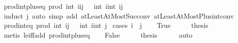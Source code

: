 \begin{isabellebody}
\isanewline
{}\isamarkupfalse%
\ prod{\isacharunderscore}{\kern0pt}int{\isacharunderscore}{\kern0pt}plus{\isacharunderscore}{\kern0pt}eq{\isacharcolon}{\kern0pt}\ {\isachardoublequoteopen}prod\ int\ {\isacharbraceleft}{\kern0pt}i{\isachardot}{\kern0pt}{\isachardot}{\kern0pt}i{\isacharplus}{\kern0pt}j{\isacharbraceright}{\kern0pt}\ {\isacharequal}{\kern0pt}\ \ {\isasymProd}{\isacharbraceleft}{\kern0pt}int\ i{\isachardot}{\kern0pt}{\isachardot}{\kern0pt}int\ {\isacharparenleft}{\kern0pt}i{\isacharplus}{\kern0pt}j{\isacharparenright}{\kern0pt}{\isacharbraceright}{\kern0pt}{\isachardoublequoteclose}\isanewline
%
\isadelimproof
\ \ %
\endisadelimproof
%
\isatagproof
{}\isamarkupfalse%
\ {\isacharparenleft}{\kern0pt}induct\ j{\isacharparenright}{\kern0pt}\ {\isacharparenleft}{\kern0pt}auto\ simp\ add{\isacharcolon}{\kern0pt}\ atLeastAtMostSuc{\isacharunderscore}{\kern0pt}conv\ atLeastAtMostPlus{}{\isacharunderscore}{\kern0pt}int{\isacharunderscore}{\kern0pt}conv{\isacharparenright}{\kern0pt}%
\endisatagproof
{\isafoldproof}%
%
\isadelimproof
\isanewline
%
\endisadelimproof
\isanewline
{}\isamarkupfalse%
\ prod{\isacharunderscore}{\kern0pt}int{\isacharunderscore}{\kern0pt}eq{\isacharcolon}{\kern0pt}\ {\isachardoublequoteopen}prod\ int\ {\isacharbraceleft}{\kern0pt}i{\isachardot}{\kern0pt}{\isachardot}{\kern0pt}j{\isacharbraceright}{\kern0pt}\ {\isacharequal}{\kern0pt}\ \ {\isasymProd}{\isacharbraceleft}{\kern0pt}int\ i{\isachardot}{\kern0pt}{\isachardot}{\kern0pt}int\ j{\isacharbraceright}{\kern0pt}{\isachardoublequoteclose}\isanewline
%
\isadelimproof
%
\endisadelimproof
%
\isatagproof
{}\isamarkupfalse%
\ {\isacharparenleft}{\kern0pt}cases\ {\isachardoublequoteopen}i\ {\isasymle}\ j{\isachardoublequoteclose}{\isacharparenright}{\kern0pt}\isanewline
\ \ \isamarkupfalse%
\ True\isanewline
\ \ \isamarkupfalse%
\ \isamarkupfalse%
\ {\isacharquery}{\kern0pt}thesis\isanewline
\ \ \ \ \isamarkupfalse%
\ {\isacharparenleft}{\kern0pt}metis\ le{\isacharunderscore}{\kern0pt}iff{\isacharunderscore}{\kern0pt}add\ prod{\isacharunderscore}{\kern0pt}int{\isacharunderscore}{\kern0pt}plus{\isacharunderscore}{\kern0pt}eq{\isacharparenright}{\kern0pt}\isanewline
{}\isamarkupfalse%
\isanewline
\ \ \isamarkupfalse%
\ False\isanewline
\ \ \isamarkupfalse%
\ \isamarkupfalse%
\ {\isacharquery}{\kern0pt}thesis\isanewline
\ \ \ \ \isamarkupfalse%
\ auto\isanewline
{}\isamarkupfalse%

\end{isabellebody}
